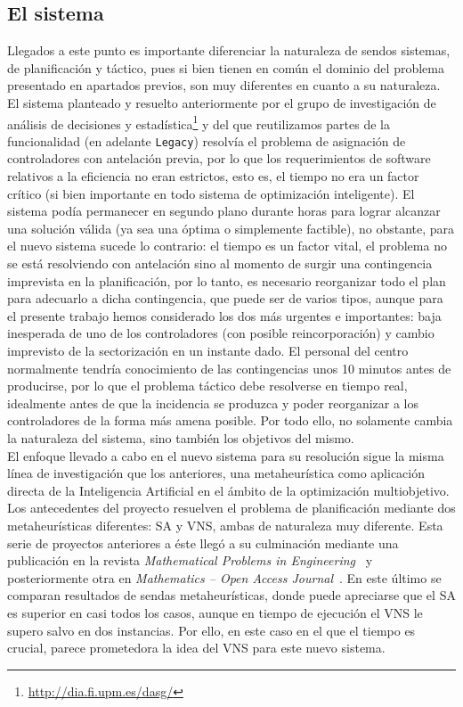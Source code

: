 \subsection{El sistema \legacy{}}
\label{apartado:2:detalles-sistema}
Llegados a este punto es importante diferenciar la naturaleza de sendos sistemas, de planificación y táctico, pues si bien tienen en común el dominio del problema presentado en apartados previos, son muy diferentes en cuanto a su naturaleza.
\\

El sistema planteado y resuelto anteriormente por el grupo de investigación de análisis de decisiones y estadística\footnote{\url{http://dia.fi.upm.es/dasg/}} y del que reutilizamos partes de la funcionalidad (en adelante \texttt{Legacy}) resolvía el problema de asignación de controladores con antelación previa, por lo que los requerimientos de software relativos a la eficiencia no eran estrictos, esto es, el tiempo no era un factor crítico (si bien importante en todo sistema de optimización inteligente). El sistema podía permanecer en segundo plano durante horas para lograr alcanzar una solución válida (ya sea una óptima o simplemente factible), no obstante, para el nuevo sistema sucede lo contrario: 
el tiempo es un factor vital, el problema no se está resolviendo con antelación sino al momento de surgir una contingencia imprevista en la planificación, por lo tanto, es necesario reorganizar todo el plan para adecuarlo a dicha contingencia, que puede ser de varios tipos, aunque para el presente trabajo hemos considerado los dos más urgentes e importantes: baja inesperada de uno de los controladores (con posible reincorporación) y cambio imprevisto de la sectorización en un instante dado. 
El personal del centro normalmente tendría conocimiento de las contingencias unos 10 minutos antes de producirse, por lo que el problema táctico debe resolverse en tiempo real, idealmente antes de que la incidencia se produzca y poder reorganizar a los controladores de la forma más amena posible.
Por todo ello, no solamente cambia la naturaleza del sistema, sino también los objetivos del mismo.
\\

El enfoque llevado a cabo en el nuevo sistema para su resolución sigue la misma línea de investigación que los anteriores, una metaheurística como aplicación directa de la Inteligencia Artificial en el ámbito de la optimización multiobjetivo.
Los antecedentes del proyecto resuelven el problema de planificación mediante dos metaheurísticas diferentes: \gls{SA} y \gls{VNS}, ambas de naturaleza muy diferente. 
Esta serie de proyectos anteriores a éste llegó a su culminación mediante una publicación en la revista \textit{Mathematical Problems in Engineering}~\cite{articulo1} y posteriormente otra en \textit{Mathematics -- Open Access Journal}~\cite{articulo2}. 
En este último se comparan resultados de sendas metaheurísticas, donde puede apreciarse que el SA es superior en casi todos los casos, aunque en tiempo de ejecución el VNS le supero salvo en dos instancias. Por ello, en este caso en el que el tiempo es crucial, parece prometedora la idea del VNS para este nuevo sistema. 
\\

